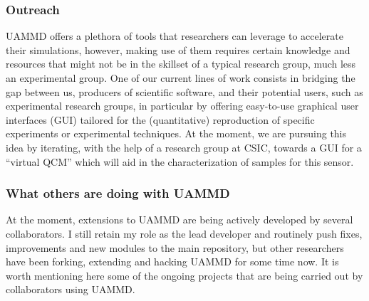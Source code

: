 \documentclass[twoside,openright,titlepage,numbers=noenddot,%
headinclude,footinclude,cleardoublepage=empty,abstract=on,
BCOR=5mm,fontsize=11pt, dvipsnames, paper=b5
]{scrreprt}
\begin{document}
\subsubsection*{Outreach}
UAMMD offers a plethora of tools that researchers can leverage to accelerate their simulations, however, making use of them requires certain knowledge and resources that might not be in the skillset of a typical research group, much less an experimental group. One of our current lines of work consists in bridging the gap between us, producers of scientific software, and their potential users, such as experimental research groups, in particular by offering easy-to-use graphical user interfaces (GUI) tailored for the (quantitative) reproduction of specific experiments or experimental techniques. At the moment, we are pursuing this idea by iterating, with the help of a research group at CSIC, towards a GUI for a ``virtual QCM'' which will aid in the characterization of samples for this sensor.

\subsubsection*{What others are doing with UAMMD}
At the moment, extensions to UAMMD are being actively developed by several collaborators. I still retain my role as the lead developer and routinely push fixes, improvements and new modules to the main repository, but other researchers have been forking, extending and hacking UAMMD for some time now. It is worth mentioning here some of the ongoing projects that are being carried out by collaborators using UAMMD.
\end{document}
